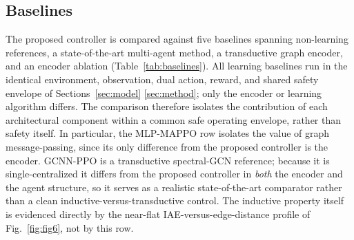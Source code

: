 \documentclass[lettersize,journal]{IEEEtran}
\begin{document}
\begin{table}[!t]
\caption{Contingency scenarios.}
\label{tab:scenarios}
\centering
\footnotesize
{}
\end{table}

\subsection{Baselines}
\label{sec:casestudy:baselines}

The proposed controller is compared against five baselines spanning non-learning references, a state-of-the-art multi-agent method, a transductive graph encoder, and an encoder ablation (Table~\ref{tab:baselines}). All learning baselines run in the identical environment, observation, dual action, reward, and shared safety envelope of Sections~\ref{sec:model} \ref{sec:method}; only the encoder or learning algorithm differs. The comparison therefore isolates the contribution of each architectural component within a common safe operating envelope, rather than safety itself. In particular, the MLP-MAPPO row isolates the value of graph message-passing, since its only difference from the proposed controller is the encoder. GCNN-PPO is a transductive spectral-GCN reference; because it is single-centralized it differs from the proposed controller in \emph{both} the encoder and the agent structure, so it serves as a realistic state-of-the-art comparator rather than a clean inductive-versus-transductive control. The inductive property itself is evidenced directly by the near-flat IAE-versus-edge-distance profile of Fig.~\ref{fig:fig6}, not by this row.
\end{document}
